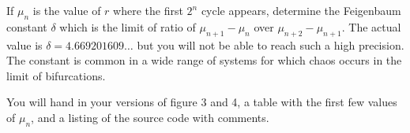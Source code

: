 \documentclass[letterpaper,11pt]{article}
\begin{document}
\begin{itemize}
 If $\mu_n$ is the value of $r$ where the first $2^n$ cycle appears, determine the Feigenbaum constant $\delta$ which is the limit of ratio of $\mu_{n+1}-\mu_n$ over $\mu_{n+2}-\mu_{n+1}$.  The actual value is $\delta = 4.669201609\ldots$ but you will not be able to reach such a high precision.  The constant is common in a wide range of systems for which chaos occurs in the limit of bifurcations.
 
 You will hand in your versions of figure 3 and 4, a table with the first few values of $\mu_n$, and a listing of the source code with comments.
\end{itemize}
\end{document}
